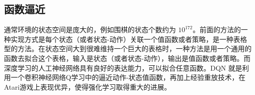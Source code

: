 \subsection{函数逼近}
通常环境的状态空间是庞大的，例如围棋的状态个数约为 $10^{172}$。前面的方法的一种实现方式是每个状态（或者状态-动作）关联一个值函数或者策略，是一种表格型的方法。在状态空间大到很难维持一个巨大的表格时，一种方法是用一个通用的函数去拟合这个表格，输入是状态（或者状态-动作），输出是值函数或者策略。而深度学习的人工神经网络具有良好的表达能力，可以拟合任意函数。DQN \cite{mnihPlayingAtariDeep2013} \cite{mnihHumanlevelControlDeep2015} 就是利用一个卷积神经网络Q学习中的逼近动作-状态值函数，再加上经验重放技术，在Atari游戏上表现优异，使得强化学习取得重大的进展。



